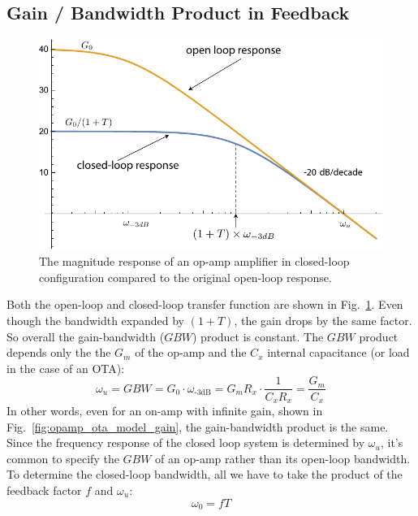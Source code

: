 \subsection{Gain / Bandwidth Product in Feedback}
\begin{figure}[tb]
\begin{center}
\includegraphics[width=.7\columnwidth]{mag1pole_fb}
\end{center}
\caption{The magnitude response of an op-amp amplifier in closed-loop configuration compared to the original open-loop response.}
\label{fig:mag1pole_fb}
\end{figure}

Both the open-loop and closed-loop transfer function are shown in Fig.~\ref{fig:mag1pole_fb}.  Even though the bandwidth expanded by $(1+T)$, the gain drops by the same factor. So overall the gain-bandwidth ($GBW$) product is constant. The $GBW$ product depends only the the $G_m$ of the op-amp and the $C_x$ internal capacitance (or load in the case of an OTA):
\begin{equation}
	\omega_u = GBW = G_0 \cdot \omega_{\text{-3dB}}  = G_m R_x \cdot \frac{1}{C_x R_x} = \frac{G_m}{C_x}
\end{equation} 
In other words, even for an on-amp with infinite gain, shown in Fig.~\ref{fig:opamp_ota_model_gain}, the gain-bandwidth product is the same.  Since the frequency response of the closed loop system is determined by $\omega_u$, it's common to specify the $GBW$ of an op-amp rather than its open-loop bandwidth.  To determine the closed-loop bandwidth, all we have to take the product of the feedback factor $f$ and $\omega_u$:
\begin{equation}
	\omega_0 = f T
\end{equation} 

